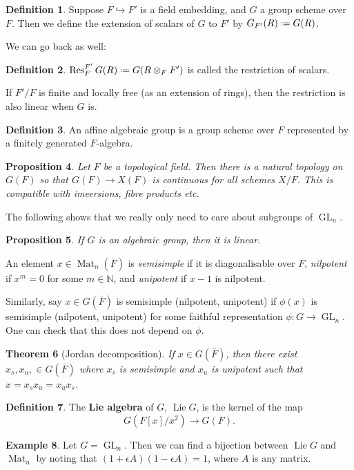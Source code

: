 \documentclass[11pt]{report}
\newcommand{\1}{\mathbbm 1}
\newcommand{\N}{\mathbb{N}}
\newcommand*{\defeq}{\mathrel{\vcenter{\baselineskip0.5ex \lineskiplimit0pt
      \hbox{\scriptsize.}\hbox{\scriptsize.}}}%
  =}
\renewcommand{\bar}{\overline}
\DeclareMathOperator{\Lie}{Lie}
\DeclareMathOperator{\GL}{GL}
\DeclareMathOperator{\Mat}{Mat}
\theoremstyle{plain}
\newtheorem{thm}{Theorem}[section]
\newcounter{ex}
\newtheorem{prop}[thm]{Proposition}
\theoremstyle{definition}
\newtheorem{mydef}[thm]{Definition}
\newtheorem{example}[thm]{Example}
\theoremstyle{remark}
\numberwithin{equation}{section}
\begin{document}
\begin{mydef}
  Suppose $F \hookrightarrow F'$ is a field embedding, and $G$ a group scheme over
  $F$. Then we define the extension of scalars of $G$ to $F'$ by
  $G_{F'}(R) \defeq G(R)$.
\end{mydef}

We can go back as well:
\begin{mydef}
  $\Res_{F}^{F'}G (R) \defeq G(R\otimes_{F}F')$ is called the restriction of scalars.
\end{mydef}
If $F'/F$ is finite and locally free (as an extension of rings), then
the restriction is also linear when $G$ is.

\begin{mydef}
  An affine algebraic group is a group scheme over $F$ represented by
  a finitely generated $F$-algebra.
\end{mydef}

\begin{prop}
  Let $F$ be a topological field. Then there is a natural topology on
  $G(F)$ so that $G(F) \to X(F)$ is continuous for all schemes
  $X/F$. This is compatible with imeersions, fibre products etc. 
\end{prop}

The following shows that we really only need to care about subgroups
of $\GL_{n}$. 
\begin{prop}
If $G$ is an algebraic group, then it is linear.
\end{prop}

An element $x \in \Mat_{n}(\bar F)$ is \emph{semisimple} if it is
diagonalisable over $F$, \emph{nilpotent} if $x^{m}= 0$ for some
$m \in \N$, and \emph{unipotent} if $x-1$ is nilpotent.

Similarly, say $x \in G(\bar F)$ is semisimple (nilpotent, unipotent) if
$\phi(x)$ is semisimple (nilpotent, unipotent) for some faithful representation
$\phi : G \to \GL_{n}$. One can check that this does not depend on $\phi$.

\begin{thm}[Jordan decomposition]
  If $x \in G(\bar F)$, then there exist $x_{s},x_{u}, \in G(\bar F)$
  where $x_{s}$ is semisimple and $x_{u}$ is unipotent such that
  $x = x_{s}x_{u} = x_{u}x_{s}$.
\end{thm}

\begin{mydef}
  The \textbf{Lie algebra} of $G$, $\Lie G$, is the kernel of the map
  \begin{equation}
    \label{eq:5}
    G(F[x]/x^{2}) \to G(F).
  \end{equation}
\end{mydef}
\begin{example}
  Let $G = \GL_{n}$. Then we can find a bijection between $\Lie G$ and
  $\Mat_{n}$  by noting that $(1+ \epsilon A)(1-\epsilon A) = 1$, where $A$ is any matrix.
\end{example}
\end{document}
